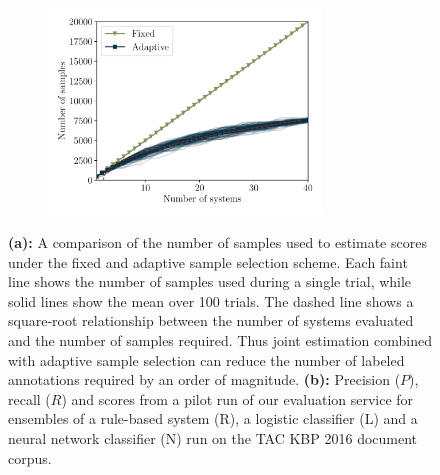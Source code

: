 \begin{figure}[!h]
  \centering
  \begin{subfigure}{\textwidth}
    \centering
    \includegraphics[width=0.8\textwidth]{figures/simulation/simulation-n}
    \caption{}
  \end{subfigure}

  \begin{subfigure}{0.49\textwidth}
    \centering
    
    \vfill
    \caption{\label{fig:evaluation-results}}
  \end{subfigure}

  \caption[An evaluation of the importance-reweighted estimator]{\label{fig:evaluation}
  \textbf{(a):} 
  A comparison of the number of samples used to estimate scores under the fixed and adaptive sample selection scheme.
  Each faint line shows the number of samples used during a single trial, while solid lines show the mean over 100 trials.
  The dashed line shows a square-root relationship between the number of systems evaluated and the number of samples required.
  Thus joint estimation combined with adaptive sample selection can reduce the number of labeled annotations required by an order of magnitude.
  \textbf{(b):} 
Precision ($P$), recall ($R$) and \fone{} scores from a pilot run of our evaluation service for ensembles of a rule-based system (R), a logistic classifier (L) and a neural network classifier (N) run on the TAC KBP 2016 document corpus. 
  }
\end{figure}

